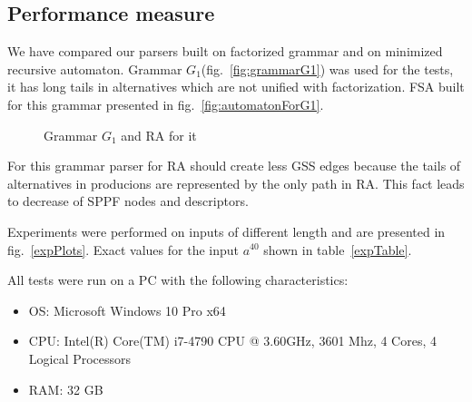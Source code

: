 \documentclass[runningheads,a4paper]{llncs}
\begin{document}
\subsection{Performance measure}

We have compared our parsers built on factorized grammar and on minimized recursive automaton.
Grammar $G_1$(fig.~\ref{fig:grammarG1}) was used for the tests,
it has long tails in alternatives which are not unified with factorization.
FSA built for this grammar presented in fig.~\ref{fig:automatonForG1}.

\begin{figure}[ht]   
    \centering

    \caption{Grammar $G_1$ and RA for it}
\end{figure}

For this grammar parser for RA should create less GSS edges because the tails of alternatives in producions
are represented by the only path in RA. This fact leads to decrease of SPPF nodes and descriptors.

Experiments were performed on inputs of different length and are presented in fig.~\ref{expPlots}.
Exact values for the input $a^{40}$ shown in table~\ref{expTable}.

All tests were run on a PC with the following characteristics:
\begin{itemize}
    \item OS: Microsoft Windows 10 Pro x64
    \item CPU: Intel(R) Core(TM) i7-4790 CPU @ 3.60GHz, 3601 Mhz, 4 Cores, 4 Logical Processors
    \item RAM: 32 GB
\end{itemize}
\end{document}
